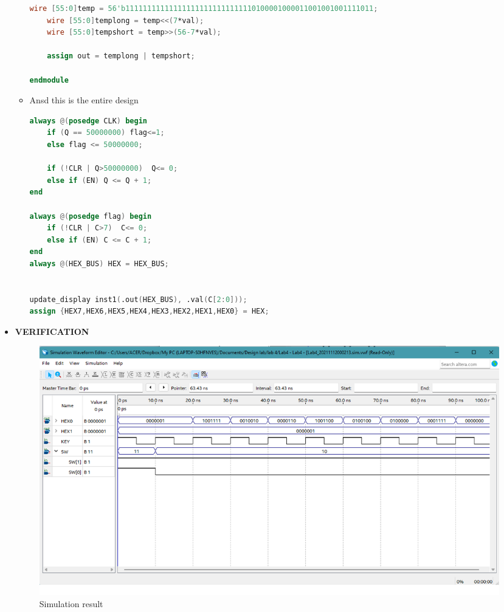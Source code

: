 \begin{itemize}
\begin{itemize}
\begin{lstlisting}[language = verilog]
	wire [55:0]temp = 56'b111111111111111111111111111110100001000011001001001111011;
	wire [55:0]templong = temp<<(7*val);
	wire [55:0]tempshort = temp>>(56-7*val);
	
	assign out = templong | tempshort;

endmodule
                    \end{lstlisting}
            \item[]Ansd this is the entire design
                \begin{lstlisting}[language = verilog]
always @(posedge CLK) begin
    if (Q == 50000000) flag<=1;
    else flag <= 50000000;
    
    if (!CLR | Q>50000000)  Q<= 0;
    else if (EN) Q <= Q + 1;
end

always @(posedge flag) begin
    if (!CLR | C>7)  C<= 0;
    else if (EN) C <= C + 1;
end
always @(HEX_BUS) HEX = HEX_BUS;


update_display inst1(.out(HEX_BUS), .val(C[2:0]));
assign {HEX7,HEX6,HEX5,HEX4,HEX3,HEX2,HEX1,HEX0} = HEX;
                \end{lstlisting}
            \end{itemize}
    \item[]\textbf{VERIFICATION}
        \begin{figure}[h]
            \centering
            \includegraphics[scale = 0.5]{source/picture/lab4/part1.png}
            \caption{Simulation result}
        \end{figure}
\end{itemize}
\clearpage